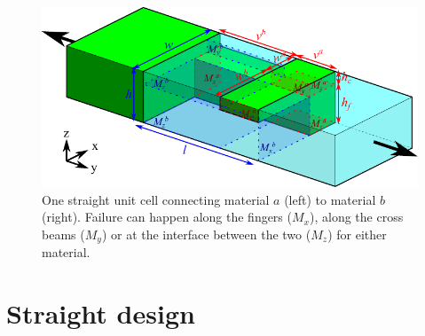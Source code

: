 
\begin{figure}[H]
	\centering
	\includegraphics[width=\columnwidth]{sources/method/straight_model_v3.pdf}
	\caption{
		One straight unit cell connecting material $a$ (left) to material $b$ (right).
		Failure can happen along the fingers ($M_x$), along the cross beams ($M_y$) or at the interface between the two ($M_z$) for either material.}
	\label{fig:failure_modes}
\end{figure}


\newcommand{\hmin}{\underline{h}}
\newcommand{\wmin}{\underline{w}}
\newcommand{\lmax}{\overline{l}}

\section{Straight design}

